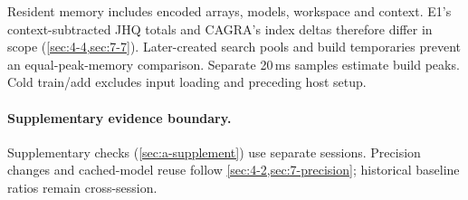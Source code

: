 Resident memory includes encoded arrays, models, workspace and context. E1's context-subtracted JHQ totals and CAGRA's index deltas therefore differ in scope (\cref{sec:4-4,sec:7-7}). Later-created search pools and build temporaries prevent an equal-peak-memory comparison. Separate 20\,ms samples estimate build peaks. Cold train/add excludes input loading and preceding host setup.

\paragraph{Supplementary evidence boundary.}
Supplementary checks (\cref{sec:a-supplement}) use separate sessions. Precision changes and cached-model reuse follow \cref{sec:4-2,sec:7-precision}; historical baseline ratios remain cross-session.